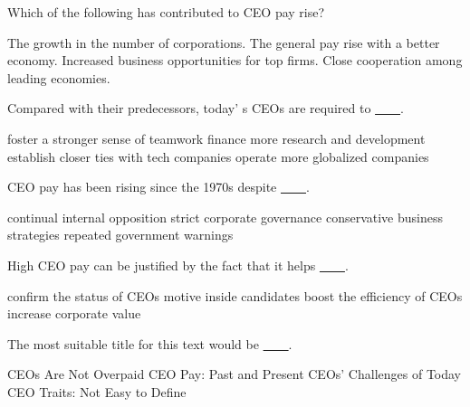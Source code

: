 \item Which of the following has contributed to CEO pay rise?
\begin{tasks}
	\task The growth in the number of corporations.
	\task The general pay rise with a better economy.
	\task Increased business opportunities for top firms.
	\task Close cooperation among leading economies.
\end{tasks}
\item Compared with their predecessors, today' s CEOs are required to \uline{~~~~}.
\begin{tasks}
	\task foster a stronger sense of teamwork
	\task finance more research and development
	\task establish closer ties with tech companies
	\task operate more globalized companies
\end{tasks}
\item CEO pay has been rising since the 1970s despite \uline{~~~~}.
\begin{tasks}
	\task continual internal opposition
	\task strict corporate governance
	\task conservative business strategies
	\task repeated government warnings
\end{tasks}
\item High CEO pay can be justified by the fact that it helps \uline{~~~~}.
\begin{tasks}
	\task confirm the status of CEOs
	\task motive inside candidates
	\task boost the efficiency of CEOs
	\task increase corporate value
\end{tasks}
\item The most suitable title for this text would be \uline{~~~~}.
\begin{tasks}
	\task CEOs Are Not Overpaid
	\task CEO Pay: Past and Present
	\task CEOs' Challenges of Today
	\task CEO Traits: Not Easy to Define
\end{tasks}
